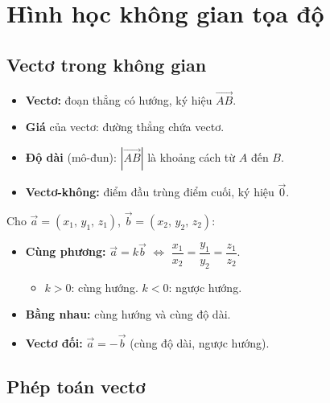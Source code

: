 \documentclass[12pt,a4paper]{article}
\begin{document}
\newpage
\section{Hình học không gian tọa độ}

\subsection{Vectơ trong không gian}

\begin{dinhnghia}
  \begin{itemize}
    \item \textbf{Vectơ:} đoạn thẳng có hướng, ký hiệu $\overrightarrow{AB}$.
    \item \textbf{Giá} của vectơ: đường thẳng chứa vectơ.
    \item \textbf{Độ dài} (mô-đun): $|\overrightarrow{AB}|$ là khoảng cách từ $A$ đến $B$.
    \item \textbf{Vectơ-không:} điểm đầu trùng điểm cuối, ký hiệu $\vec{0}$.
  \end{itemize}
\end{dinhnghia}

\begin{tinhchat}
  Cho $\vec{a} = (x_1,\, y_1,\, z_1)$, $\vec{b} = (x_2,\, y_2,\, z_2)$:
  \begin{itemize}
    \item \textbf{Cùng phương:} $\vec{a} = k\vec{b}$ $\Leftrightarrow$ $\dfrac{x_1}{x_2} = \dfrac{y_1}{y_2} = \dfrac{z_1}{z_2}$.
    \begin{itemize}
      \item $k > 0$: cùng hướng. \qquad $k < 0$: ngược hướng.
    \end{itemize}
    \item \textbf{Bằng nhau:} cùng hướng và cùng độ dài.
    \item \textbf{Vectơ đối:} $\vec{a} = -\vec{b}$ (cùng độ dài, ngược hướng).
  \end{itemize}
\end{tinhchat}

\subsection{Phép toán vectơ}
\end{document}
